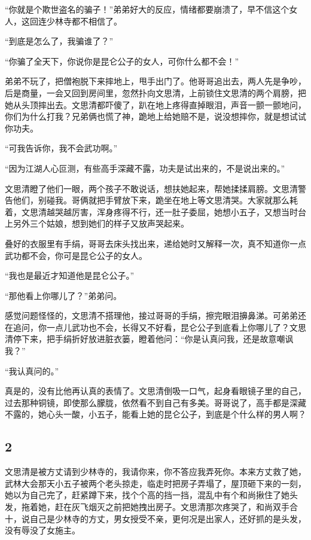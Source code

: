 “你就是个欺世盗名的骗子！”弟弟好大的反应，情绪都要崩溃了，早不信这个女人，这回连少林寺都不相信了。

“到底是怎么了，我骗谁了？”

“你骗了全天下，你说你是昆仑公子的女人，可你什么都不会！”

弟弟不玩了，把僧袍脱下来摔地上，甩手出门了。他哥哥追出去，两人先是争吵，后是商量，一会又回到房间里，忽然扑向文思清，上前锁住文思清的两个肩膀，把她从头顶摔出去。文思清都吓傻了，趴在地上疼得直掉眼泪，声音一颤一颤地问，你们为什么打我？兄弟俩也慌了神，跪地上给她赔不是，说没想摔你，就是想试试你功夫。

“可我告诉你，我不会武功啊。”

“因为江湖人心叵测，有些高手深藏不露，功夫是试出来的，不是说出来的。”

文思清瞪了他们一眼，两个孩子不敢说话，想扶她起来，帮她揉揉肩膀。文思清警告他们，别碰我。哥俩就把手臂放下来，跪坐在地上等文思清哭。大家就那么耗着，文思清越哭越厉害，浑身疼得不行，还一肚子委屈，她想小五子，又想当时台上另外三个姑娘，想到她们的样子又放声哭起来。

叠好的衣服里有手绢，哥哥去床头找出来，递给她时又解释一次，真不知道你一点武功都不会，你可是昆仑公子的女人。

“我也是最近才知道他是昆仑公子。”

“那他看上你哪儿了？”弟弟问。

感觉问题怪怪的，文思清不搭理他，接过哥哥的手绢，擦完眼泪擤鼻涕。可弟弟还在追问，你一点儿武功也不会，长得又不好看，昆仑公子到底看上你哪儿了？文思清停下来，把手绢折好放进脏衣篓，瞪着他问：“你是认真问我，还是故意嘲讽我？”

“我认真问的。”

真是的，没有比他再认真的表情了。文思清倒吸一口气，起身看眼镜子里的自己，过去那种铜镜，即使那么朦胧，依然看不到自己有多美。哥哥说了，高手都是深藏不露的，她心头一酸，小五子，能看上她的昆仑公子，到底是个什么样的男人啊？
\newline

{\centering\subsection{2}}

文思清是被方丈请到少林寺的，我请你来，你不答应我弄死你。本来方丈救了她，武林大会那天小五子被两个老头掠走，临走时把房子弄塌了，屋顶砸下来的一刻，她以为自己完了，赶紧蹲下来，找个个高的挡一挡，混乱中有个和尚揪住了她头发，拖着她，赶在灰飞烟灭之前把她拽出房子。文思清那次疼哭了，和尚双手合十，说自己是少林寺的方丈，男女授受不亲，更何况是出家人，还好抓的是头发，没有辱没了女施主。


